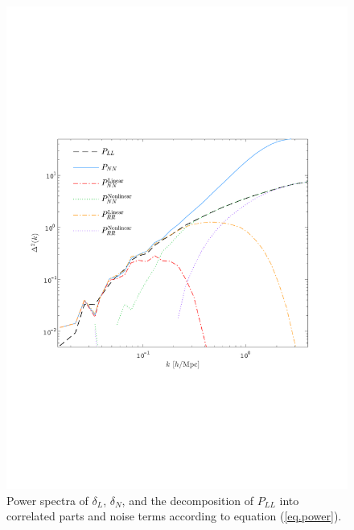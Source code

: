 \documentclass[aps,prd,twocolumn,superscriptaddress,amsfont,amssymb,amsmath,nofootinbib,showpacs,balancelastpage]{revtex4-1}
\begin{document}
\begin{figure}[t] \centering
  \includegraphics[width=1.0\linewidth]{power.pdf}
  \caption{Power spectra of $\delta_L$, $\delta_N$, and the decomposition
  of $P_{LL}$ into correlated parts and noise terms according to equation
  (\ref{eq.power}).}
  \label{fig.recopower}
\end{figure}
\end{document}
